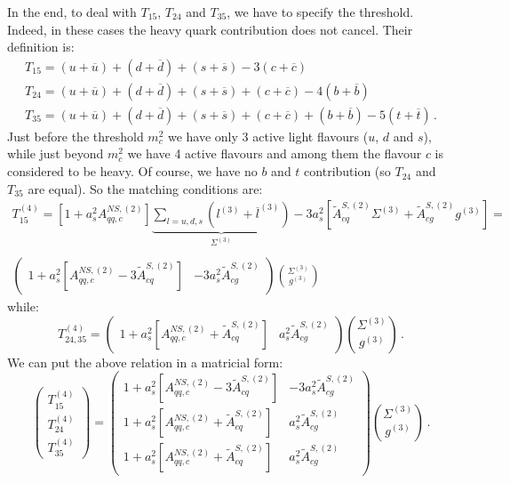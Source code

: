 \documentclass[10pt,a4paper]{article}
\begin{document}
In the end, to deal with $T_{15}$, $T_{24}$ and $T_{35}$, we have to
specify the threshold. Indeed, in these cases the heavy quark
contribution does not cancel. Their definition is:
\begin{equation}
\begin{array}{l}
T_{15}=(u+\overline{u})+(d+\overline{d})+(s+\overline{s})-3(c+\overline{c})\\
T_{24}=(u+\overline{u})+(d+\overline{d})+(s+\overline{s})+(c+\overline{c})-4(b+\overline{b})\\
T_{35}=(u+\overline{u})+(d+\overline{d})+(s+\overline{s})+(c+\overline{c})+(b+\overline{b})-5(t+\overline{t})\,.
\end{array}
\end{equation}
Just before the threshold $m_c^2$ we have only 3 active light flavours
($u$, $d$ and $s$), while just beyond $m_c^2$ we have 4 active
flavours and among them the flavour $c$ is considered to be heavy. Of
course, we have no $b$ and $t$ contribution (so $T_{24}$ and $T_{35}$
are equal). So the matching conditions are:
\begin{equation}
\begin{array}{c}
\displaystyle T_{15}^{(4)}=[1+a_s^2A_{qq,c}^{N\!S,(2)}]\underbrace{\sum_{l=u,d,s}(l^{(3)}+\overline{l}^{(3)})}_{\Sigma^{(3)}}-3a_s^2[\tilde{A}^{S,(2)}_{cq}\Sigma^{(3)}+\tilde{A}^{S,(2)}_{cg}g^{(3)}]=\\
\\
\displaystyle \begin{pmatrix} 1+a_s^2[A_{qq,c}^{N\!S,(2)}-3\tilde{A}^{S,(2)}_{cq}] & -3a_s^2\tilde{A}^{S,(2)}_{cg}\end{pmatrix}{\Sigma^{(3)} \choose g^{(3)}}
\end{array}
\end{equation}
while:
\begin{equation}
T_{24,35}^{(4)}=\begin{pmatrix} 1+a_s^2[A_{qq,c}^{N\!S,(2)}+\tilde{A}^{S,(2)}_{cq}] & a_s^2\tilde{A}^{S,(2)}_{cg}\end{pmatrix}{\Sigma^{(3)} \choose g^{(3)}}\,.
\end{equation}
We can put the above relation in a matricial form:
\begin{equation}
\begin{pmatrix} T_{15}^{(4)} \\ T_{24}^{(4)} \\ T_{35}^{(4)} \end{pmatrix} = \begin{pmatrix}  1+a_s^2[A_{qq,c}^{N\!S,(2)}-3\tilde{A}^{S,(2)}_{cq}] & -3a_s^2\tilde{A}^{S,(2)}_{cg}\\  
1+a_s^2[A_{qq,c}^{N\!S,(2)}+\tilde{A}^{S,(2)}_{cq}] & a_s^2\tilde{A}^{S,(2)}_{cg} \\
1+a_s^2[A_{qq,c}^{N\!S,(2)}+\tilde{A}^{S,(2)}_{cq}] &
a_s^2\tilde{A}^{S,(2)}_{cg} \end{pmatrix}{\Sigma^{(3)} \choose
g^{(3)}}\,.
\label{pippo1}
\end{equation}
\end{document}
